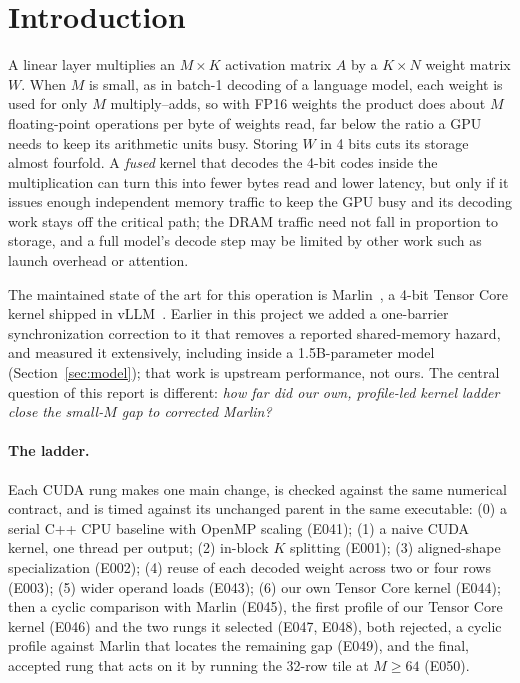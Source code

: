 \documentclass[sigconf,nonacm]{acmart}
\begin{document}
\maketitle

\section{Introduction}
A linear layer multiplies an $M \times K$ activation matrix $A$ by a $K \times N$ weight matrix $W$. When $M$ is small, as in batch-1 decoding of a language model, each weight is used for only $M$ multiply--adds, so with FP16 weights the product does about $M$ floating-point operations per byte of weights read, far below the ratio a GPU needs to keep its arithmetic units busy. Storing $W$ in 4 bits cuts its storage almost fourfold. A \emph{fused} kernel that decodes the 4-bit codes inside the multiplication can turn this into fewer bytes read and lower latency, but only if it issues enough independent memory traffic to keep the GPU busy and its decoding work stays off the critical path; the DRAM traffic need not fall in proportion to storage, and a full model's decode step may be limited by other work such as launch overhead or attention.

The maintained state of the art for this operation is Marlin~\cite{marlin}, a 4-bit Tensor Core kernel shipped in vLLM~\cite{vllm}. Earlier in this project we added a one-barrier synchronization correction to it that removes a reported shared-memory hazard, and measured it extensively, including inside a 1.5B-parameter model (Section~\ref{sec:model}); that work is upstream performance, not ours. The central question of this report is different: \emph{how far did our own, profile-led kernel ladder close the small-$M$ gap to corrected Marlin?}

\paragraph{The ladder.} Each CUDA rung makes one main change, is checked against the same numerical contract, and is timed against its unchanged parent in the same executable:
(0) a serial C++ CPU baseline with OpenMP scaling (E041);
(1) a naive CUDA kernel, one thread per output;
(2) in-block $K$ splitting (E001);
(3) aligned-shape specialization (E002);
(4) reuse of each decoded weight across two or four rows (E003);
(5) wider operand loads (E043);
(6) our own Tensor Core kernel (E044);
then a cyclic comparison with Marlin (E045), the first profile of our Tensor Core kernel (E046) and the two rungs it selected (E047, E048), both rejected, a cyclic profile against Marlin that locates the remaining gap (E049), and the final, accepted rung that acts on it by running the 32-row tile at $M \ge 64$ (E050).
\end{document}
